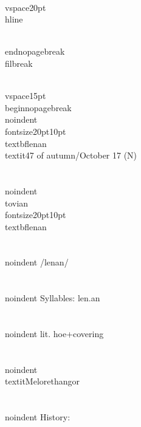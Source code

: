 \\vspace{20pt}\\hline

\\end{nopagebreak}
\\filbreak



\\vspace{15pt}
\\begin{nopagebreak}
\\noindent{\\fontsize{20pt}{10pt}\\textbf{lenan} } \\textit{47 of autumn/October 17} (N)\\\\
\\noindent {\\tovian \\fontsize{20pt}{10pt} \\textbf{lenan} }\\\\
\\noindent /l{\textprimstress}enan/\\\\
\\noindent Syllables: len.an\\\\
\\noindent lit. hoe+covering\\\\
\\noindent \\textit{Melorethangor}\\\\


\\noindent History:

